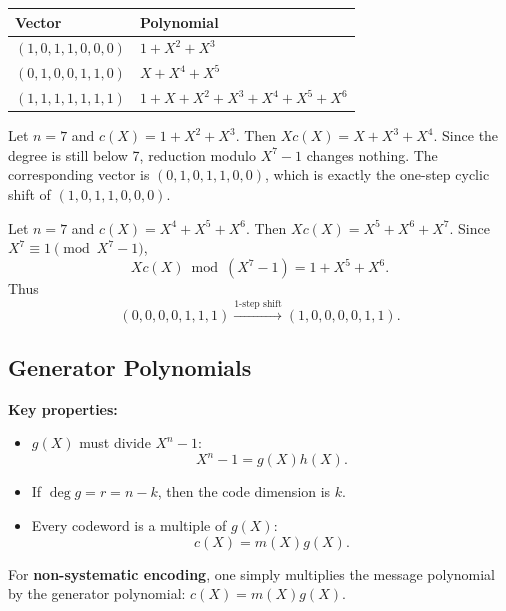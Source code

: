 \begin{example}[Vector $\leftrightarrow$ Polynomial conversion, $n=7$]
\begin{center}
\begin{tabular}{@{}ll@{}}
	\toprule
	\textbf{Vector} & \textbf{Polynomial} \\
	\midrule
	\((1,0,1,1,0,0,0)\) & \(1+X^2+X^3\) \\
	\((0,1,0,0,1,1,0)\) & \(X+X^4+X^5\) \\
	\((1,1,1,1,1,1,1)\) & \(1+X+X^2+X^3+X^4+X^5+X^6\) \\
	\bottomrule
\end{tabular}
\end{center}
\end{example}

\begin{example}
Let \(n=7\) and \(c(X)=1+X^2+X^3\). Then \(Xc(X)=X+X^3+X^4\). Since the degree is still below 7, reduction modulo \(X^7-1\) changes nothing. The corresponding vector is \((0,1,0,1,1,0,0)\), which is exactly the one-step cyclic shift of \((1,0,1,1,0,0,0)\).
\end{example}

\begin{example}
Let \(n=7\) and \(c(X)=X^4+X^5+X^6\). Then \(Xc(X)=X^5+X^6+X^7\). Since \(X^7 \equiv 1 \pmod{X^7-1}\),
\[Xc(X) \bmod (X^7-1)=1+X^5+X^6.\]
Thus
\[(0,0,0,0,1,1,1) \xrightarrow{\text{1-step shift}} (1,0,0,0,0,1,1).\]
\end{example}

\newpage
\subsection{Generator Polynomials}


\textbf{Key properties:}
\begin{itemize}
	\item \(g(X)\) must divide \(X^n-1\): \[X^n-1 = g(X)h(X).\]
	\item If \(\deg g = r = n-k\), then the code dimension is \(k\).
	\item Every codeword is a multiple of \(g(X)\): \[c(X)=m(X)g(X).\]
\end{itemize}
For \textbf{non-systematic encoding}, one simply multiplies the message polynomial by the generator polynomial: \(c(X)=m(X)g(X)\).

